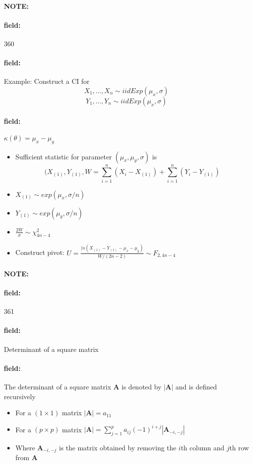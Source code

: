 \documentclass[12pt]{article}
\newenvironment{note}{\paragraph{NOTE:}}{}
\newenvironment{field}{\paragraph{field:}}{}
\begin{document}
\begin{note}
    \begin{field}
        \tiny 360
    \end{field}
    \begin{field}
        Example: Construct a CI for $$ X_1, \ldots , X_n \sim iid Exp(\mu_x,\sigma)$$ $$Y_1, \ldots , Y_n \sim iid Exp(\mu_x,\sigma)$$


    \end{field}
    \begin{field}
        $\kappa(\theta) = \mu_x - \mu_y$
        \begin{itemize}
          \item Sufficient statistic for parameter $(\mu_x,\mu_y,\sigma)$ is
          $$(X_{(1)}, Y_{(1)}, W = \sum_{i=1}^n (X_i - X_{(1)}) + \sum_{i=1}^n (Y_i - Y_{(1)}) $$
          \item $X_{(1)} \sim exp(\mu_x, \sigma/n)$
          \item $Y_{(1)} \sim exp(\mu_y, \sigma/n)$
          \item $\frac{2W}{\sigma} \sim \chi^2_{4n-4}$
          \item Construct pivot: $U = \frac{|n(X_{(1)} - Y_{(1)} - \mu_x - \mu_y)}{W/(2n-2)} \sim F_{2,4n-4}$
        \end{itemize}
    \end{field}
\end{note}

\begin{note}
    \begin{field}
        \tiny 361
    \end{field}
    \begin{field}
        Determinant of a square matrix
    \end{field}
    \begin{field}
        The determinant of a square matrix $\mathbf{A}$ is denoted by $|\mathbf{A}|$ and is defined recursively
        \begin{itemize}
          \item For a $(1 \times 1 )$ matrix $|\mathbf{A}| = a_{11}$
          \item For a $(p\times p)$ matrix $|\mathbf{A}| = \sum_{j=1}^p a_{ij}(-1)^{i+j}|\mathbf{A}_{-i,-j}|$
          \item Where $\mathbf{A}_{-i,-j}$ is the matrix obtained by removing the $i$th column and $j$th row from $\mathbf{A}$
        \end{itemize}
    \end{field}
\end{note}
\end{document}
